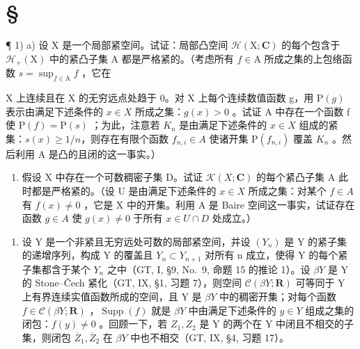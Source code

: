 \section*{\texorpdfstring{\S\CurrentExerciseGroup}{第{\CurrentExerciseGroup}节}}
{}

¶ 1) a) 设 X 是一个局部紧空间。试证：局部凸空间 \(\mathcal{H}(\mathrm{X};\mathbf{C})\) 的每个包含于 \(\mathcal{H}_{+}(\mathrm{X})\) 中的紧凸子集 A 都是严格紧的。（考虑所有 \(f\in\mathrm{A}\) 所成之集的上包络函数 \(s=\sup_{f\in\mathrm{A}}f\) ，它在

X 上连续且在 X 的无穷远点处趋于 0。对 X 上每个连续数值函数 g，用 \(\mathrm{P}(g)\) 表示由满足下述条件的 \(x \in X\) 所成之集：\(g(x) > 0\) 。试证 A 中存在一个函数 f 使 \(\mathrm{P}(f) = \mathrm{P}(s)\) ；为此，注意若 \(K_{n}\) 是由满足下述条件的 \(x \in X\) 组成的紧集：\(s(x) \geqslant 1/n\)，则存在有限个函数 \(f_{n,i} \in A\) 使诸开集 \(\mathrm{P}(f_{n,i})\) 覆盖 \(K_{n}\) 。然后利用 A 是凸的且闭的这一事实。）

\begin{enumerate}
\def\labelenumi{\alph{enumi})}
\setcounter{enumi}{1}
\tightlist
\item
  假设 X 中存在一个可数稠密子集 D。试证 \(\mathcal{K}(X; \mathbf{C})\) 的每个紧凸子集 A 此时都是严格紧的。（设 U 是由满足下述条件的 \(x \in X\) 所成之集：对某个 \(f \in A\) 有 \(f(x) \neq 0\) ，它是 X 中的开集。利用 A 是 Baire 空间这一事实，试证存在函数 \(g \in A\) 使 \(g(x) \neq 0\) 于所有 \(x \in U \cap D\) 处成立。）
\end{enumerate}

\begin{enumerate}
\def\labelenumi{\arabic{enumi})}
\setcounter{enumi}{1}
\tightlist
\item
  设 Y 是一个非紧且无穷远处可数的局部紧空间，并设 \((Y_{n})\) 是 Y 的紧子集的递增序列，构成 Y 的覆盖且 \(Y_{n} \subset Y_{n+1}\) 对所有 n 成立，使得 Y 的每个紧子集都含于某个 \(Y_{n}\) 之中（GT, I, §9, No.~9, 命题 15 的推论 1）。设 \(\beta Y\) 是 Y 的 Stone--Čech 紧化（GT, IX, §1, 习题 7），则空间 \(\mathcal{C}(\beta Y; \mathbf{R})\) 可等同于 Y 上有界连续实值函数所成的空间，且 Y 是 \(\beta Y\) 中的稠密开集；对每个函数 \(f \in \mathcal{C}(\beta Y; \mathbf{R})\) ，\(\operatorname{Supp}(f)\) 就是 \(\beta Y\) 中由满足下述条件的 \(y \in Y\) 组成之集的闭包：\(f(y) \neq 0\) 。回顾一下，若 \(Z_{1}, Z_{2}\) 是 Y 的两个在 Y 中闭且不相交的子集，则闭包 \(\overline{Z}_{1}, \overline{Z}_{2}\) 在 \(\beta Y\) 中也不相交（GT, IX, §4, 习题 17）。
\end{enumerate}

